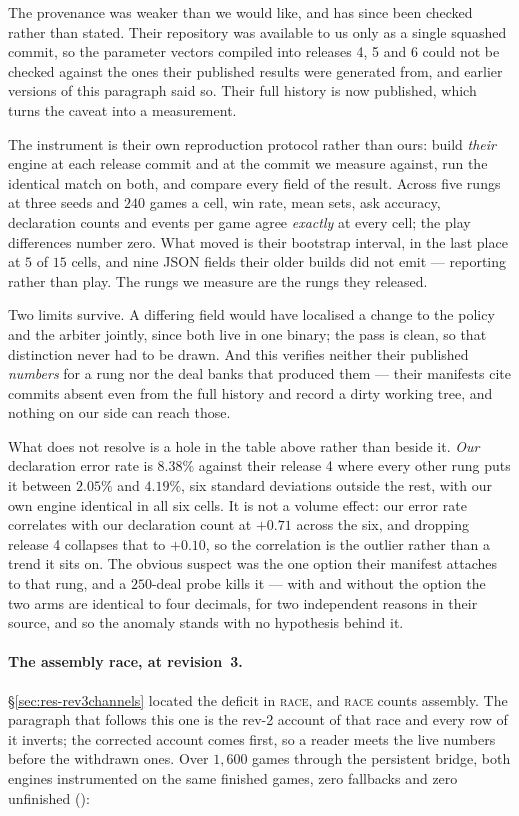 \documentclass[11pt,letterpaper]{article}
\begin{document}
The provenance was weaker than we would like, and has since been checked rather
than stated. Their repository was available to us only as a single squashed
commit, so the parameter vectors compiled into releases 4, 5 and 6 could not be
checked against the ones their published results were generated from, and
earlier versions of this paragraph said so. Their full history is now published,
which turns the caveat into a measurement.

The instrument is their own reproduction protocol rather than ours: build
\emph{their} engine at each release commit and at the commit we measure
against, run the identical match on both, and compare every field of the
result. Across five rungs at three seeds and $240$ games a cell, win rate, mean
sets, ask accuracy, declaration counts and events per game agree \emph{exactly}
at every cell; the play differences number zero. What moved is their bootstrap
interval, in the last place at $5$ of $15$ cells, and nine JSON fields their
older builds did not emit --- reporting rather than play. The rungs we measure
are the rungs they released.

Two limits survive. A differing field would have localised a change to the
policy and the arbiter jointly, since both live in one binary; the pass is
clean, so that distinction never had to be drawn. And this verifies neither
their published \emph{numbers} for a rung nor the deal banks that produced them
--- their manifests cite commits absent even from the full history and record a
dirty working tree, and nothing on our side can reach those.

What does not resolve is a hole in the table above rather than beside it.
\emph{Our} declaration error rate is $8.38\%$ against their release 4 where every
other rung puts it between $2.05\%$ and $4.19\%$, six standard deviations
outside the rest, with our own engine identical in all six cells. It is not a
volume effect: our error rate correlates with our declaration count at $+0.71$
across the six, and dropping release 4 collapses that to $+0.10$, so the
correlation is the outlier rather than a trend it sits on. The obvious
suspect was the one option their manifest attaches to that rung, and a
$250$-deal probe kills it --- with and without the option the two arms are
identical to four decimals, for two independent reasons in their source, and
so the anomaly stands with no hypothesis behind it.

\paragraph{The assembly race, at revision~3.} \label{sec:res-assembly}
\S\ref{sec:res-rev3channels} located the deficit in \textsc{race}, and
\textsc{race} counts assembly. The paragraph that follows this one is the
rev-2 account of that race and every row of it inverts; the corrected account
comes first, so a reader meets the live numbers before the withdrawn ones.
Over $1{,}600$ games through the persistent bridge, both engines instrumented
on the same finished games, zero fallbacks and zero unfinished
():
\end{document}
